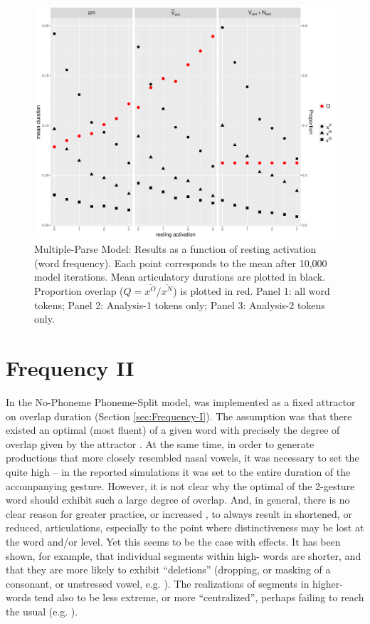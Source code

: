 \begin{figure}[h]
\includegraphics[width=.70\textwidth]{figures/MultipleParseResults.pdf}
\caption{\label{fig:Multiple-Parse-Results}Multiple-Parse Model: Results as
a function of resting activation (word frequency). Each point corresponds
to the mean after 10,000 model iterations. Mean articulatory durations
are plotted in black. Proportion overlap ($Q={\overline{x^{O}}}/{\overline{x^{N}}}$)
is plotted in red. Panel 1: all word tokens; Panel 2: Analysis-1 tokens
only; Panel 3: Analysis-2 tokens only.}
\end{figure}


\section{\label{sec:Frequency-II}Frequency II}

In the No-Phoneme Phoneme-Split model,  was implemented as
a fixed attractor on overlap duration (Section \ref{sec:Frequency-I}).
The assumption was that there existed an optimal (most fluent) 
of a given word with precisely the degree of  overlap given
by the attractor . At the same time, in order to generate productions
that more closely resembled nasal vowels, it was necessary to set
the  quite high – in the reported simulations it was set to
the entire duration of the accompanying  gesture. However, it
is not clear why the optimal  of the 2-gesture word should
exhibit such a large degree of overlap. And, in general, there is
no clear reason for greater practice, or increased , to always
result in shortened, or reduced, articulations, especially to the
point where distinctiveness may be lost at the word and/or 
level. Yet this seems to be the case with  effects. It has
been shown, for example, that individual segments within high-
words are shorter, and that they are more likely to exhibit “deletions”
(dropping, or masking of a consonant, or unstressed vowel, e.g.
\citealt{Bell2003,Raymond2006,Bybee2008}). The realizations of segments
in higher- words tend also to be less extreme, or more “centralized”,
perhaps failing to reach the usual   (e.g. \citealt{munson2004effect,Scarborough2004,gahl2008time}).


